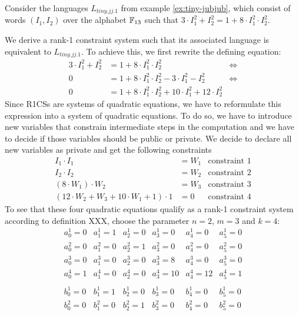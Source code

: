 \begin{example} Consider the languages $L_{tiny.jj.1}$ from example \ref{ex:tiny-jubjub}, which consist of words $(I_1,I_2)$ over the alphabet $\mathbb{F}_{13}$ such that $3\cdot I_1^2 + I_2^2 = 1 + 8\cdot I_1^2\cdot I_2^2$. 

We derive a rank-1 constraint system such that its associated language is equivalent to $L_{tiny.jj.1}$.  To achieve this, we first rewrite the defining equation:
\begin{align*}
3\cdot I_1^2 + I_2^2  & = 1 + 8\cdot I_1^2\cdot I_2^2 & \Leftrightarrow \\
 0 & = 1 + 8\cdot I_1^2\cdot I_2^2 - 3\cdot I_1^2 - I_2^2  & \Leftrightarrow \\
 0 & = 1 + 8\cdot I_1^2\cdot I_2^2 + 10\cdot I_1^2 +12\cdot I_2^2
\end{align*}
Since R1CSs are systems of quadratic equations, we have to reformulate this expression into a system of quadratic equations. To do so, we have to introduce new variables that constrain intermediate steps in the computation and we have to decide if those variables should be public or private. We decide to declare all new variables as private and get the following constraints
\begin{align*}
I_1 \cdot I_1 & = W_1 & \text{constraint } 1\\
I_2 \cdot I_2 & = W_2 & \text{constraint } 2\\
(8 \cdot W_1) \cdot W_2 & = W_3 & \text{constraint } 3\\
(12\cdot W_2 + W_3 + 10\cdot W_1 + 1)\cdot 1 & = 0 & \text{constraint } 4
\end{align*}
To see that these four quadratic equations qualify as a rank-1 constraint system according to definition XXX, choose the parameter $n=2$, $m=3$ and $k=4$:
$$
\begin{array}{llllll}
a_0^1 = 0 & a_1^1= 1 & a_2^1= 0 & a_3^1 = 0 & a_4^1= 0  & a_5^1= 0 \\ 
a_0^2 = 0 & a_1^2= 0 & a_2^2= 1 & a_3^2 = 0 & a_4^2= 0  & a_5^2= 0 \\ 
a_0^3 = 0 & a_1^3= 0 & a_2^3= 0 & a_3^3 = 8 & a_4^3= 0  & a_5^3= 0 \\ 
a_0^4 = 1 & a_1^4= 0 & a_2^4= 0 & a_3^4 = 10 & a_4^4= 12  & a_5^4= 1 \\ 
\\
b_0^1 = 0 & b_1^1= 1 & b_2^1= 0 & b_3^1 = 0 & b_4^1= 0  & b_5^1= 0 \\ 
b_0^2 = 0 & b_1^2= 0 & b_2^2= 1 & b_3^2 = 0 & b_4^2= 0  & b_5^2= 0 \\ 

\end{array}$$
\end{example}
